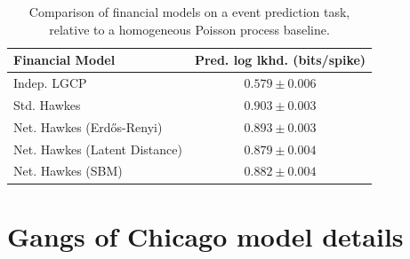 \begin{table}
  \begin{tabular}{|l|c|}
    \hline
    \textbf{Financial Model} & \textbf{Pred. log lkhd. (bits/spike)} \\
    \hline
    Indep. LGCP & $0.579\pm 0.006$ \\
    Std. Hawkes & $0.903\pm 0.003$ \\
    Net. Hawkes (Erd\H{o}s-Renyi) & $0.893\pm 0.003$ \\
    Net. Hawkes (Latent Distance) & $0.879\pm 0.004$ \\
    Net. Hawkes (SBM) & $0.882\pm 0.004$ \\
    \hline
  \end{tabular}
  \caption[Financial model predictive log likelhioods]{Comparison of
    financial models on a event prediction task, relative to a
    homogeneous Poisson process baseline.}
  \label{tab:financial_pred_ll_sbm}
\end{table}


\section{Gangs of Chicago model details}

